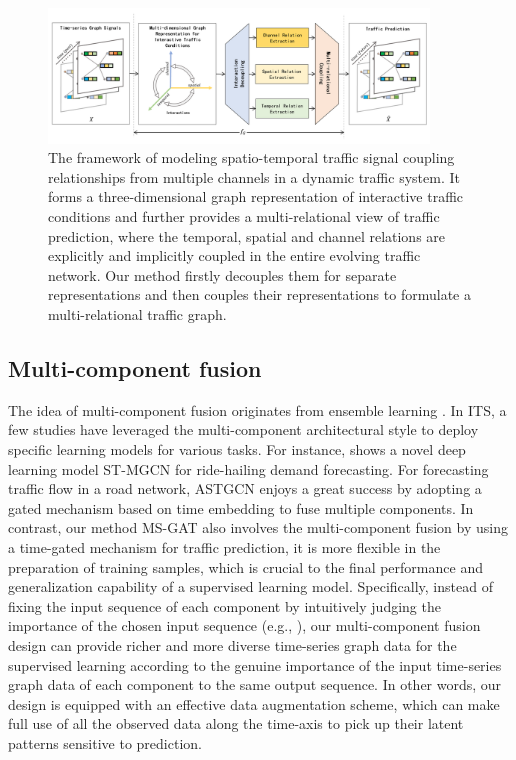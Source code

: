 \begin{figure}[!ht]
    \centering
    \includegraphics[width=0.9\textwidth]{pictures/Core.png}
    \caption{The framework of modeling spatio-temporal traffic signal coupling relationships from multiple channels in a dynamic traffic system. It forms a three-dimensional graph representation of interactive traffic conditions and further provides a multi-relational view of traffic prediction, where the temporal, spatial and channel relations are explicitly and implicitly coupled in the entire evolving traffic network. Our method firstly decouples them for separate representations and then couples their representations to formulate a multi-relational traffic graph.}
    \label{fig:core}
\end{figure}


\subsection{Multi-component fusion}
The idea of multi-component fusion originates from ensemble learning \cite{dong2020survey}. In ITS, a few studies have leveraged the multi-component architectural style to deploy specific learning models for various tasks. For instance, \cite{geng2019spatiotemporal} shows a novel deep learning model  ST-MGCN for ride-hailing demand forecasting. For forecasting traffic flow in a road network, ASTGCN \cite{guo2019attention} enjoys a great success by adopting a gated mechanism based on time embedding to fuse multiple components. In contrast, our method MS-GAT also involves the multi-component fusion by using a time-gated mechanism for traffic prediction, it is more flexible in the preparation of training samples, which is crucial to the final performance and generalization capability of a supervised learning model. Specifically, instead of fixing the input sequence of each component by intuitively judging the importance of the chosen input sequence (e.g., \cite{guo2019attention}), our multi-component fusion design can provide richer and more diverse time-series graph data for the supervised learning according to the genuine importance of the input time-series graph data of each component to the same output sequence. In other words, our design is equipped with an effective data augmentation scheme, which can make full use of all the observed data along the time-axis to pick up their latent patterns sensitive to prediction.

